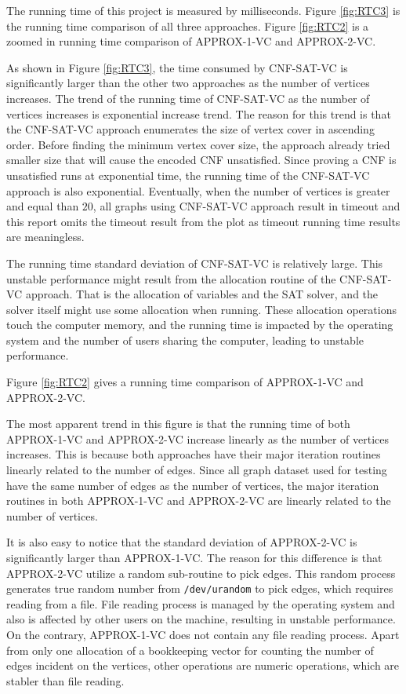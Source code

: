 \documentclass[11pt]{extarticle}
\begin{document}
The running time of this project is measured by milliseconds. Figure \ref{fig:RTC3} is the running time comparison of all three approaches. Figure \ref{fig:RTC2} is a zoomed in running time comparison of APPROX-1-VC and APPROX-2-VC.

As shown in Figure \ref{fig:RTC3}, the time consumed by CNF-SAT-VC is significantly larger than the other two approaches as the number of vertices increases. The trend of the running time of CNF-SAT-VC as the number of vertices increases is exponential increase trend. The reason for this trend is that the CNF-SAT-VC approach enumerates the size of vertex cover in ascending order. Before finding the minimum vertex cover size, the approach already tried smaller size that will cause the encoded CNF unsatisfied. Since proving a CNF is unsatisfied runs at exponential time, the running time of the CNF-SAT-VC approach is also exponential. Eventually, when the number of vertices is greater and equal than \(20\), all graphs using CNF-SAT-VC approach result in timeout and this report omits the timeout result from the plot as timeout running time results are meaningless.

The running time standard deviation of CNF-SAT-VC is relatively large. This unstable performance might result from the allocation routine of the CNF-SAT-VC approach. That is the allocation of variables and the SAT solver, and the solver itself might use some allocation when running. These allocation operations touch the computer memory, and the running time is impacted by the operating system and the number of users sharing the computer, leading to unstable performance.

\vspace{6mm}

Figure \ref{fig:RTC2} gives a running time comparison of APPROX-1-VC and APPROX-2-VC.

The most apparent trend in this figure is that the running time of both APPROX-1-VC and APPROX-2-VC increase linearly as the number of vertices increases. This is because both approaches have their major iteration routines linearly related to the number of edges. Since all graph dataset used for testing have the same number of edges as the number of vertices, the major iteration routines in both APPROX-1-VC and APPROX-2-VC are linearly related to the number of vertices.

It is also easy to notice that the standard deviation of APPROX-2-VC is significantly larger than APPROX-1-VC. The reason for this difference is that APPROX-2-VC utilize a random sub-routine to pick edges. This random process generates true random number from \texttt{/dev/urandom} to pick edges, which requires reading from a file. File reading process is managed by the operating system and also is affected by other users on the machine, resulting in unstable performance. On the contrary, APPROX-1-VC does not contain any file reading process. Apart from only one allocation of a bookkeeping vector for counting the number of edges incident on the vertices, other operations are numeric operations, which are stabler than file reading.
\end{document}
